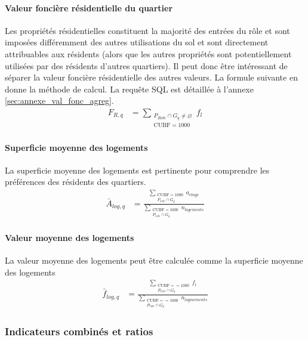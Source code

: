             \paragraph{Valeur foncière résidentielle du quartier} Les propriétés résidentielles constituent la majorité des entrées du rôle et sont imposées différemment des autres utilisations du sol et sont directement attribuables aux résidents (alors que les autres propriétés sont potentiellement utilisées par des résidents d'autres quartiers). Il peut donc être intéressant de séparer la valeur foncière résidentielle des autres valeurs. La formule suivante en donne la méthode de calcul. La requête SQL est détaillée à l'annexe \ref{sec:annexe_val_fonc_agreg}.
            \begin{align}
                F_{R,q} &= \sum_{\substack{P_{Role} \cap G_q\neq\varnothing \\ \text{CUBF} = 1000}}{f_{l}}  \label{eq:val-log-tot-quart}
            \end{align}
            \paragraph{Superficie moyenne des logements} La superficie moyenne des logements est pertinente pour comprendre les préférences des résidents des quartiers.
            \begin{align}
                \bar{A}_{log,q} &= \frac{\sum_{\substack{\text{CUBF} =1000 \\ P_{role} \cap G_q}}{a_{etage}}}{\sum_{\substack{\text{CUBF} =1000 \\ P_{role} \cap G_q}}n_{logements}}   \label{eq:sup-moy-log}
            \end{align}
            \paragraph{Valeur moyenne des logements} La valeur moyenne des logements peut être calculée comme la superficie moyenne des logements
            \begin{align}
                \bar{f}_{log,q} &= \frac{\sum_{\substack{\text{CUBF} ==1000 \\ P_{role} \cap G_q}}{f_l}}{\sum_{\substack{\text{CUBF} ==1000 \\ P_{role} \cap G_q}}{n_{logmements}}}   \label{eq:val-moy-log}
            \end{align}
        
        \subsubsection{Indicateurs combinés et ratios}
